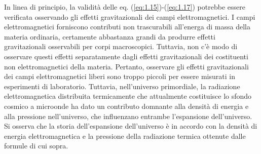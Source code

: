 In linea di principio, la validità delle eq. (\ref{eq:1.15})-(\ref{eq:1.17}) potrebbe essere verificata osservando gli effetti gravitazionali dei campi elettromagnetici. I campi elettromagnetici forniscono contributi non trascurabili all'energa di massa della materia ordinaria, certamente abbastanza grandi da produrre effetti gravitazionali osservabili per corpi macroscopici. Tuttavia, non c'è modo di osservare questi effetti separatamente dagli effetti gravitazionali dei costituenti non elettromagnetici della materia. Pertanto, osservare gli effetti gravitazionali dei campi elettromagnetici liberi sono troppo piccoli per essere misurati in esperimenti di laboratorio. Tuttavia, nell'universo primordiale, la radiazione elettromagnetica distribuita termicamente che attualmente costituisce lo sfondo cosmico a microonde ha dato un contributo domnante alla densità di energia e alla pressione nell'universo, che influenzano entrambe l'espansione dell'universo. Si osserva che la storia dell'espansione dell'universo è in accordo con la densità di energia elettromagnetica e la pressione della radiazione termica ottenute dalle formule di cui sopra. 
